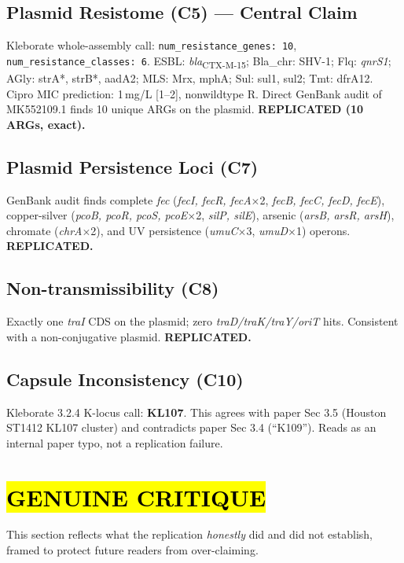 \documentclass[11pt]{article}
\begin{document}
\subsection{Plasmid Resistome (C5) --- Central Claim}
Kleborate whole-assembly call: \texttt{num\_resistance\_genes: 10}, \texttt{num\_resistance\_classes: 6}. ESBL: \textit{bla}\textsubscript{CTX-M-15}; Bla\_chr: SHV-1; Flq: \textit{qnrS1}; AGly: strA*, strB*, aadA2; MLS: Mrx, mphA; Sul: sul1, sul2; Tmt: dfrA12. Cipro MIC prediction: 1\,mg/L [1--2], nonwildtype R. Direct GenBank audit of MK552109.1 finds 10 unique ARGs on the plasmid. \textbf{REPLICATED (10 ARGs, exact).}

\subsection{Plasmid Persistence Loci (C7)}
GenBank audit finds complete \textit{fec} (\textit{fecI, fecR, fecA}$\times$2, \textit{fecB, fecC, fecD, fecE}), copper-silver (\textit{pcoB, pcoR, pcoS, pcoE}$\times$2, \textit{silP, silE}), arsenic (\textit{arsB, arsR, arsH}), chromate (\textit{chrA}$\times$2), and UV persistence (\textit{umuC}$\times$3, \textit{umuD}$\times$1) operons. \textbf{REPLICATED.}

\subsection{Non-transmissibility (C8)}
Exactly one \textit{traI} CDS on the plasmid; zero \textit{traD/traK/traY/oriT} hits. Consistent with a non-conjugative plasmid. \textbf{REPLICATED.}

\subsection{Capsule Inconsistency (C10)}
Kleborate 3.2.4 K-locus call: \textbf{KL107}. This agrees with paper Sec 3.5 (Houston ST1412 KL107 cluster) and contradicts paper Sec 3.4 (``K109''). Reads as an internal paper typo, not a replication failure.

\section{\hl{GENUINE CRITIQUE}}
This section reflects what the replication \emph{honestly} did and did not establish, framed to protect future readers from over-claiming.
\end{document}
